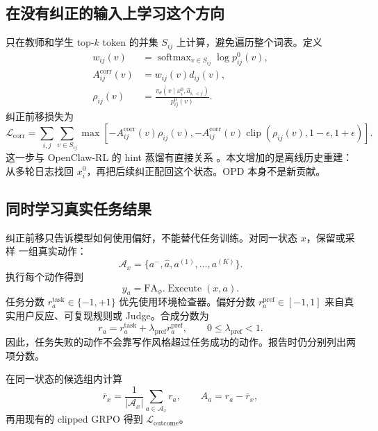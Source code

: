 \documentclass[11pt,UTF8,fontset=fandol]{ctexart}
\newcommand{\FA}{\mathrm{FA}_{\phi}}
\newcommand{\clip}{\operatorname{clip}}
\begin{document}
\subsection{在没有纠正的输入上学习这个方向}

只在教师和学生 top-\(k\) token 的并集 \(S_{ij}\) 上计算，避免遍历整个词表。定义
\begin{align}
  w_{ij}(v)
    &=\operatorname{softmax}_{v\in S_{ij}}
      \log p_{ij}^{0}(v),\\
  A^{\mathrm{corr}}_{ij}(v)
    &=w_{ij}(v)d_{ij}(v),\\
  \rho_{ij}(v)
    &=\frac{\pi_{\theta}
       (v\mid x_i^{0},\widehat a_{i,<j})}
      {p_{ij}^{0}(v)}.
\end{align}
纠正前移损失为
\begin{equation}
  \mathcal L_{\mathrm{corr}}
  =
  \sum_{i,j}\sum_{v\in S_{ij}}
  \max\!\left[
    -A^{\mathrm{corr}}_{ij}(v)\rho_{ij}(v),
    -A^{\mathrm{corr}}_{ij}(v)
      \clip(\rho_{ij}(v),1-\epsilon,1+\epsilon)
  \right].
  \label{eq:corr-loss}
\end{equation}
这一步与 OpenClaw-RL 的 hint 蒸馏有直接关系
\cite{wang2026openclaw}。本文增加的是离线历史重建：从多轮日志找回
\(x_i^{0}\)，再把后续纠正配回这个状态。OPD 本身不是新贡献。

\subsection{同时学习真实任务结果}

纠正前移只告诉模型如何使用偏好，不能替代任务训练。对同一状态 \(x\)，保留或采样
一组真实动作：
\[
  \mathcal A_x=
  \{a^{-},\widehat a,a^{(1)},\ldots,a^{(K)}\}.
\]
执行每个动作得到
\[
  y_a=\FA.\operatorname{Execute}(x,a).
\]
任务分数 \(r_a^{\mathrm{task}}\in\{-1,+1\}\) 优先使用环境检查器。偏好分数
\(r_a^{\mathrm{pref}}\in[-1,1]\) 来自真实用户反应、可复现规则或 Judge。合成分数为
\begin{equation}
  r_a
  =r_a^{\mathrm{task}}
   +\lambda_{\mathrm{pref}}r_a^{\mathrm{pref}},
  \qquad 0\le\lambda_{\mathrm{pref}}<1.
  \label{eq:reward}
\end{equation}
因此，任务失败的动作不会靠写作风格超过任务成功的动作。报告时仍分别列出两项分数。

在同一状态的候选组内计算
\begin{equation}
  \bar r_x=\frac{1}{|\mathcal A_x|}
  \sum_{a\in\mathcal A_x}r_a,
  \qquad
  A_a=r_a-\bar r_x,
\end{equation}
再用现有的 clipped GRPO 得到
\(\mathcal L_{\mathrm{outcome}}\)。
\end{document}
